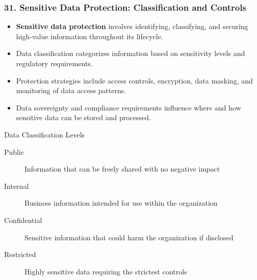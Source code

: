 \documentclass{beamer}
\begin{document}
		\begin{frame}
			\frametitle{31. Sensitive Data Protection: Classification and Controls}
			\begin{itemize}
				\item \textbf{Sensitive data protection} involves identifying, classifying, and securing high-value information throughout its lifecycle.
				\item Data classification categorizes information based on sensitivity levels and regulatory requirements.
				\item Protection strategies include access controls, encryption, data masking, and monitoring of data access patterns.
				\item Data sovereignty and compliance requirements influence where and how sensitive data can be stored and processed.
			\end{itemize}
			
			\begin{block}{Data Classification Levels}
				\scriptsize
				\begin{description}
					\item[Public] Information that can be freely shared with no negative impact
					\item[Internal] Business information intended for use within the organization
					\item[Confidential] Sensitive information that could harm the organization if disclosed
					\item[Restricted] Highly sensitive data requiring the strictest controls
				\end{description}
			\end{block}
		\end{frame}
		
\end{document}
